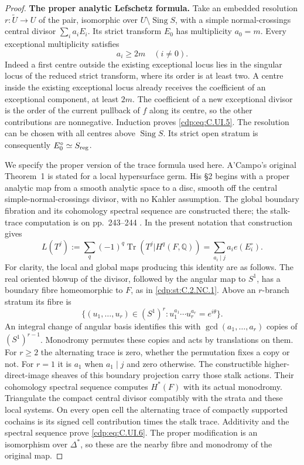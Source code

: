 \begin{proof}
\par\medskip\noindent\textbf{The proper analytic Lefschetz formula.}\quad
Take an embedded resolution
$r:\widetilde U\to U$ of the pair, isomorphic over
$U\setminus\operatorname{Sing}S$, with a simple
normal-crossings central divisor
$\sum_i a_iE_i$. Its strict transform $E_0$ has
multiplicity $a_0=m$. Every exceptional multiplicity
satisfies
\[
                    a_i\ge2m\quad(i\ne0).
 \tag{C.UI.5}\label{cdp:eq:C.UI.5}
\]
Indeed a first centre outside the existing exceptional
locus lies in the singular locus of the reduced strict
transform, where its order is at least two. A centre
inside the existing exceptional locus already receives
the coefficient of an exceptional component, at least
$2m$. The coefficient of a new exceptional divisor is
the order of the current pullback of $f$ along its centre,
so the other contributions are nonnegative. Induction
proves \eqref{cdp:eq:C.UI.5}. The resolution can be chosen with all
centres above $\operatorname{Sing}S$. Its strict open
stratum is consequently
$E_0^\circ\simeq S_{\rm reg}$.

We specify the proper version of the trace formula used
here. A'Campo's original Theorem~1 is stated for a local
hypersurface germ. His \S2 begins with a proper analytic
map from a smooth analytic space to a disc, smooth off
the central simple-normal-crossings divisor, with no
Kahler assumption. The global boundary fibration and
its cohomology spectral sequence are constructed there;
the stalk-trace computation is on pp.~243--244
\cite[\S2 and \S3]{ACampo1975}. In the present notation
that construction gives
\[
 L(T^j):=\sum_q(-1)^q\operatorname{Tr}
       (T^j|H^q(F,\mathbb Q))
       =\sum_{a_i\mid j}a_i e(E_i^\circ).
 \tag{C.UI.6}\label{cdp:eq:C.UI.6}
\]
For clarity, the local and global maps producing this
identity are as follows. The real oriented blowup of
the divisor, followed by the angular map to $S^1$,
has a boundary fibre homeomorphic to $F$, as in
\ref{cdp:st:C.2.NC.1}. Above an $r$-branch stratum its fibre is
\[
 \{(u_1,\ldots,u_r)\in(S^1)^r:
                 u_1^{a_1}\cdots u_r^{a_r}=e^{i\theta}\}.
 \tag{C.UI.7}\label{cdp:eq:C.UI.7}
\]
An integral change of angular basis identifies this with
$\gcd(a_1,\ldots,a_r)$ copies of $(S^1)^{r-1}$.
Monodromy permutes these copies and acts by translations
on them. For $r\ge2$ the alternating trace is zero,
whether the permutation fixes a copy or not. For $r=1$
it is $a_1$ when $a_1\mid j$ and zero otherwise.
The constructible higher-direct-image sheaves of this
boundary projection carry those stalk actions. Their
cohomology spectral sequence computes $H^*(F)$ with
its actual monodromy. Triangulate the compact central
divisor compatibly with the strata and these local
systems. On every open cell the alternating trace of
compactly supported cochains is its signed cell
contribution times the stalk trace. Additivity and
the spectral sequence prove \eqref{cdp:eq:C.UI.6}. The proper
modification is an isomorphism over $\Delta^*$, so
these are the nearby fibre and monodromy of the
original map.


\end{proof}
